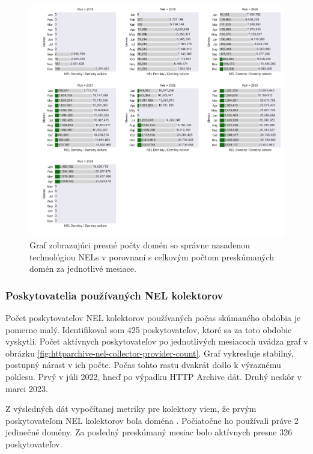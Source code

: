 \begin{figure}[!htb]
\begin{center}
 \includegraphics[scale=0.518]{obrazky-figures/httparchive_nel_deployment_ratio_values.pdf}
 \caption{\centering Graf zobrazujúci presné počty domén so správne nasadenou technológiou NELs v porovnaní s celkovým počtom preskúmaných domén za jednotlivé mesiace.}
 \label{fig:httparchive-nel-deployment_ratio_values}
\end{center}
\end{figure}

\pagebreak


\subsubsection{Poskytovatelia používaných NEL kolektorov}

Počet poskytovateľov NEL kolektorov používaných počas skúmaného obdobia je pomerne malý.
Identifikoval som 425 poskytovateľov, ktoré sa za toto obdobie vyskytli.
Počet aktívnych poskytovateľov po jednotlivých mesiacoch uvádza graf v obrázku \ref{fig:httparchive-nel-collector-provider-count}.
Graf vykresľuje stabilný, postupný nárast v ich počte.
Počas tohto rastu dvakrát došlo k výraznému poklesu.
Prvý v júli 2022, hneď po výpadku HTTP Archive dát.
Druhý neskôr v marci 2023.

Z výsledných dát vypočítanej metriky pre kolektory viem, že prvým poskytovateľom NEL kolektorov bola doména .
Počiatočne ho používali práve 2 jedinečné domény.
Za posledný preskúmaný mesiac bolo aktívnych presne 326 poskytovateľov.

